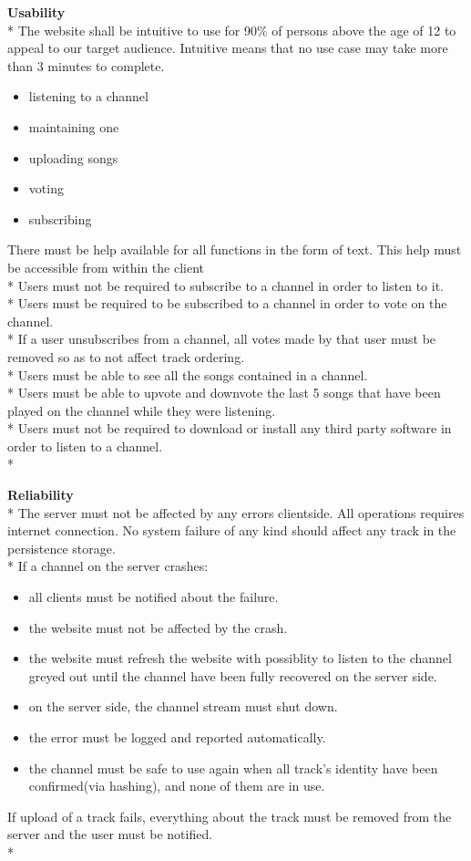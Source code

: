 \documentclass[a4paper,11pt,report]{article}
\begin{document}
\textbf{Usability} \\*
The website shall be intuitive to use for 90\% of persons above the age of 12 to appeal to our target audience. Intuitive means that no use case may take more than 3 minutes to complete.
\begin{itemize}
\item listening to a channel
\item maintaining one 
\item uploading songs
\item voting
\item subscribing
\end{itemize}

There must be help available for all functions in the form of text. This help must be accessible from within the client \\*
Users must not be required to subscribe to a channel in order to listen to it. \\*
Users must be required to be subscribed to a channel in order to vote on the channel. \\*
If a user unsubscribes from a channel, all votes made by that user must be removed so as to not affect track ordering. \\*
Users must be able to see all the songs contained in a channel. \\*
Users must be able to upvote and downvote the last 5 songs that have been played on the channel while they were listening. \\*
Users must not be required to download or install any third party software in order to listen to a channel. \\*

\textbf{Reliability} \\*
The server must not be affected by any errors clientside. All operations requires internet connection. No system failure of any kind should affect any track in the persistence storage. \\*
If a channel on the server crashes:
\begin{itemize}
\item all clients must be notified about the failure.
\item the website must not be affected by the crash.
\item the website must refresh the website with possiblity to listen to the channel greyed out until the channel have been fully recovered on the server side.
\item on the server side, the channel stream must shut down.
\item the error must be logged and reported automatically. 
\item the channel must be safe to use again when all track's identity have been confirmed(via hashing), and none of them are in use.
\end{itemize}
If upload of a track fails, everything about the track must be removed from the server and the user must be notified. \\*
\end{document}
